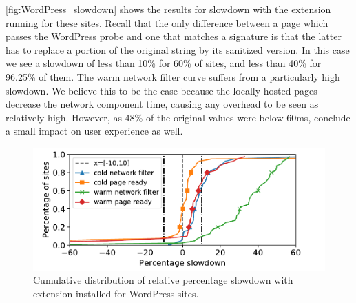 \autoref{fig:WordPress_slowdown} shows the results for slowdown with the extension running for these sites. Recall that the only difference between a page which passes the WordPress probe and one that matches a signature is that the latter has to replace a portion of the original string by its sanitized version. In this case we see a slowdown of less than 10\% for 60\% of sites, and less than 40\% for 96.25\% of them. The warm network filter curve suffers from a particularly high slowdown. We believe this to be the case because the locally hosted pages decrease the network component time, causing any overhead to be seen as relatively high. However, as 48\% of the original values were below 60ms, conclude a small impact on user experience as well.

\begin{figure}[h]
	\includegraphics[scale=0.5]{results/extension_slowdown_wordpress_small.pdf}
	\caption{Cumulative distribution of relative percentage slowdown with extension installed for WordPress sites.}
	\label{fig:WordPress_slowdown}
\end{figure}

